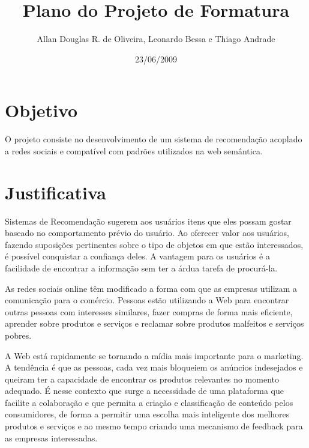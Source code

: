 \documentclass[]{article}
\title{Plano do Projeto de Formatura}
\author{Allan Douglas R. de Oliveira, Leonardo Bessa e Thiago Andrade  }
\date{23/06/2009}
\begin{document}
\ifpdf
{}
\else
{}
\fi

\maketitle


\section{Objetivo} %
\label{sec:objetivo}

 O projeto consiste no desenvolvimento de um sistema de recomendação acoplado a redes sociais e compatível com padrões utilizados na web semântica.


\section{Justificativa} %
\label{sec:objetivos_e_justificativas}

Sistemas de Recomendação sugerem aos usuários itens que eles possam gostar baseado no comportamento prévio do usuário. Ao oferecer valor aos usuários, fazendo suposições pertinentes sobre o tipo de objetos em que estão interessados, é possível conquistar a confiança deles. A vantagem para os usuários é a facilidade de encontrar a informação sem ter a árdua tarefa de procurá-la.

As redes sociais online têm modificado a forma com que as empresas utilizam a comunicação para o comércio. Pessoas estão utilizando a Web para encontrar outras pessoas com interesses similares, fazer compras de forma mais eficiente, aprender sobre produtos e serviços e reclamar sobre produtos malfeitos e serviços pobres.

A Web está rapidamente se tornando a mídia mais importante para o marketing. A tendência é que as pessoas, cada vez mais bloqueiem os anúncios indesejados e queiram ter a capacidade de encontrar os produtos relevantes no momento adequado. É nesse contexto que surge a necessidade de uma plataforma que facilite a colaboração e que permita a criação e classificação de conteúdo pelos consumidores, de forma a permitir uma escolha mais inteligente dos melhores produtos e serviços e ao mesmo tempo criando uma mecanismo de feedback para as empresas interessadas.
\end{document}
